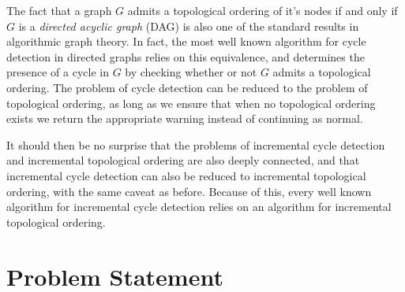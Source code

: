 \documentclass{report}
\begin{document}
The fact that a graph $G$ admits a topological ordering of it's nodes if and only if $G$ is a \textit{directed acyclic graph} (DAG) is also one of the standard results in algorithmic graph theory. In fact, the most well known algorithm for cycle detection in directed graphs relies on this equivalence, and determines the presence of a cycle in $G$ by checking whether or not $G$ admits a topological ordering. The problem of cycle detection can be reduced to the problem of topological ordering, as long as we ensure that when no topological ordering exists we return the appropriate warning instead of continuing as normal.

It should then be no surprise that the problems of incremental cycle detection and incremental topological ordering are also deeply connected, and that incremental cycle detection can also be reduced to incremental topological ordering, with the same caveat as before. Because of this, every well known algorithm for incremental cycle detection relies on an algorithm for incremental topological ordering.

\section{Problem Statement}
\end{document}
